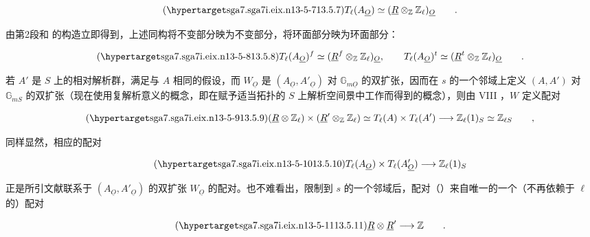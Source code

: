 \begin{equation}\tag{\SGARefTarget{sga7.sga7i.eix.n13-5-7}{13.5.7}}
 T_\ell(A_{\underline O})\simeq
 (\underline R\otimes_{\mathbb Z}\mathbb Z_\ell)_{\underline O}
 \qquad .
\end{equation}

\noindent
由第2段和  的构造立即得到，上述同构将不变部分映为不变部分，将环面部分映为环面部分：

\begin{equation}\tag{\SGARefTarget{sga7.sga7i.eix.n13-5-8}{13.5.8}}
 T_\ell(A_{\underline O})^f\simeq
 (\underline R^f\otimes_{\mathbb Z}\mathbb Z_\ell)_{\underline O},
 \qquad
 T_\ell(A_{\underline O})^t\simeq
 (\underline R^t\otimes_{\mathbb Z}\mathbb Z_\ell)_{\underline O}
 \qquad .
\end{equation}

\noindent
若 $A'$ 是 $S$ 上的相对解析群，满足与 $A$ 相同的假设，而 $W_{\underline O}$ 是 $(A_{\underline O},A'_{\underline O})$ 对 $\mathbb G_{m\underline O}$ 的双扩张，因而在 $s$ 的一个邻域上定义 $(A,A')$ 对 $\mathbb G_{mS}$ 的双扩张（现在使用复解析意义的概念，即在赋予适当拓扑的 $S$ 上解析空间景中工作而得到的概念），则由 VIII ，$W$ 定义配对

\begin{equation}\tag{\SGARefTarget{sga7.sga7i.eix.n13-5-9}{13.5.9}}
 (\underline R\otimes\mathbb Z_\ell)\times
 (\underline R'\otimes_{\mathbb Z}\mathbb Z_\ell)
 \simeq T_\ell(A)\times T_\ell(A')
 \longrightarrow\mathbb Z_\ell(1)_S
 \simeq\mathbb Z_{\ell S}\qquad ,
\end{equation}

\noindent
同样显然，相应的配对

\begin{equation}\tag{\SGARefTarget{sga7.sga7i.eix.n13-5-10}{13.5.10}}
 T_\ell(A_{\underline O})\times T_\ell(A'_{\underline O})
 \longrightarrow\mathbb Z_\ell(1)_S
\end{equation}

\noindent
正是所引文献联系于 $(A_{\underline O},A'_{\underline O})$ 的双扩张 $W_{\underline O}$ 的配对。也不难看出，限制到 $s$ 的一个邻域后，配对（）来自唯一的一个（不再依赖于 $\ell$ 的）配对

\begin{equation}\tag{\SGARefTarget{sga7.sga7i.eix.n13-5-11}{13.5.11}}
 \underline R\otimes\underline R'\longrightarrow\mathbb Z
 \qquad .
\end{equation}

